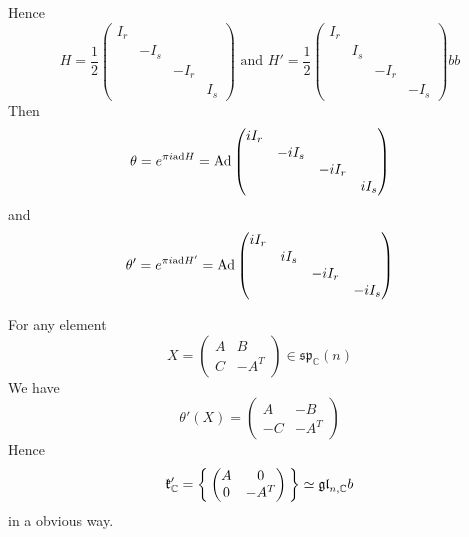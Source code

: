 \documentclass[12pt]{amsart}
\def\bC{{\mathbb{C}}}
\def\sp{{\mathfrak{sp}}}
\def\ad{{\rm ad}}
\def\Ad{{\rm Ad}}
\def\Ad{\mathrm{Ad}}
\def\agl{\mathfrak{gl}}
\def\fkk{\mathfrak{k}}
\begin{document}
Hence 
\[
H = \frac{1}{2} \begin{pmatrix}
I_r & & & \\
 & -I_s & & \\
 & & -I_r & \\
 & & & I_s 
\end{pmatrix}
\text{ and }
H' = \frac{1}{2} 
\begin{pmatrix}
I_r & & & \\
 & I_s & & \\
 & & -I_r & \\
 & & & -I_s 
\end{pmatrix}
bb\]
Then 
\[
\theta = e^{\pi i \ad H} =\Ad \begin{pmatrix}
iI_r & & & \\
 & -iI_s & & \\
 & & -iI_r & \\
 & & & iI_s 
\end{pmatrix}
\]
and
\[
\theta' = e^{\pi i \ad H'} = \Ad \begin{pmatrix}
iI_r & & & \\
 & iI_s & & \\
 & & -iI_r & \\
 & & & -iI_s 
\end{pmatrix}
\]

For any element 
\[ X = 
\begin{pmatrix}
A & B \\
C & -A^T 
\end{pmatrix} \in \sp_\bC(n)
\]
We have 
\[
\theta'(X) = \begin{pmatrix}
A & -B\\
-C & -A^T
\end{pmatrix}
\]
Hence 
\[
\fkk_\bC' = \Set{\begin{pmatrix}
A & 0 \\
0 & -A^T 
\end{pmatrix}} \simeq \agl_{n, \bC}  
b\]
in a obvious way. 
\end{document}
